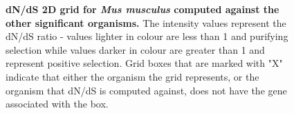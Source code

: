 \documentclass{article}
\begin{document}
\begin{figure}[H]
\centering
{}
\caption{\textbf{dN/dS 2D grid for \textit{Mus musculus} computed against the other significant organisms.} The intensity values represent the dN/dS ratio - values lighter in colour are less than 1 and purifying selection while values darker in colour are greater than 1 and represent positive selection. Grid boxes that are marked with "X" indicate that either the organism the grid represents, or the organism that dN/dS is computed against, does not have the gene associated with the box.}
\label{sup_fig_28}
\end{figure}
\end{document}
